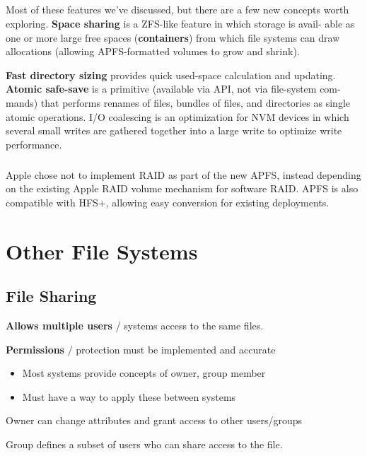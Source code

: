 \paragraph{}

Most of these features we've discussed, but there are a few new concepts worth exploring. \textbf{Space sharing} is a ZFS-like feature in which storage is avail- able as one or more large free spaces (\textbf{containers}) from which file systems can draw allocations (allowing APFS-formatted volumes to grow and shrink). 

\textbf{Fast directory sizing} provides quick used-space calculation and updating. \textbf{Atomic safe-save} is a primitive (available via API, not via file-system com- mands) that performs renames of files, bundles of files, and directories as single atomic operations. I/O coalescing is an optimization for NVM devices in which several small writes are gathered together into a large write to optimize write performance.
\paragraph{}
Apple chose not to implement RAID as part of the new APFS, instead depending on the existing Apple RAID volume mechanism for software RAID. APFS is also compatible with HFS+, allowing easy conversion for existing deployments.

\chapter{Other File
Systems}

\section{File Sharing}

\textbf{Allows multiple users} / systems access to the same files.

\textbf{Permissions} / protection must be implemented and accurate

\begin{itemize}
    \item Most systems provide concepts of owner, group member
    \item Must have a way to apply these between systems
\end{itemize}

Owner can change attributes and grant access to other users/groups


Group defines a subset of users who can share access to the file.

